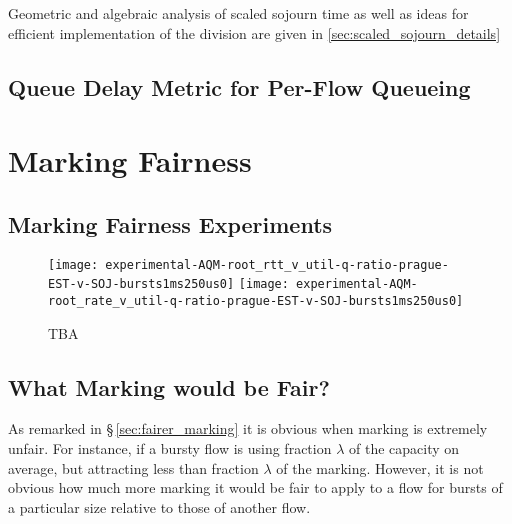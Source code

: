 Geometric and algebraic analysis of scaled sojourn time as well as ideas for efficient implementation of the division are given in \autoref{sec:scaled_sojourn_details}

\subsection{Queue Delay Metric for Per-Flow Queueing}\label{sec:fq_delay_metric}


\section{Marking Fairness}\label{sec:marking_fairness_discuss}

\subsection{Marking Fairness Experiments}\label{sec:marking_fairness_expts}


\begin{figure*}
	\centering
	\texttt{[image: experimental-AQM-root\_rtt\_v\_util-q-ratio-prague-EST-v-SOJ-bursts1ms250us0]}
	\texttt{[image: experimental-AQM-root\_rate\_v\_util-q-ratio-prague-EST-v-SOJ-bursts1ms250us0]}
	\caption{TBA}
\end{figure*}

\subsection{What Marking would be Fair?}\label{sec:marking_fairness_definition}

As remarked in \S\,\ref{sec:fairer_marking} it is obvious when marking is extremely unfair. For instance, if a bursty flow is using fraction \(\lambda\) of the capacity on average, but attracting less than fraction \(\lambda\) of the marking. However, it is not obvious how much more marking it would be fair to apply to a flow for bursts of a particular size relative to those of another flow.

